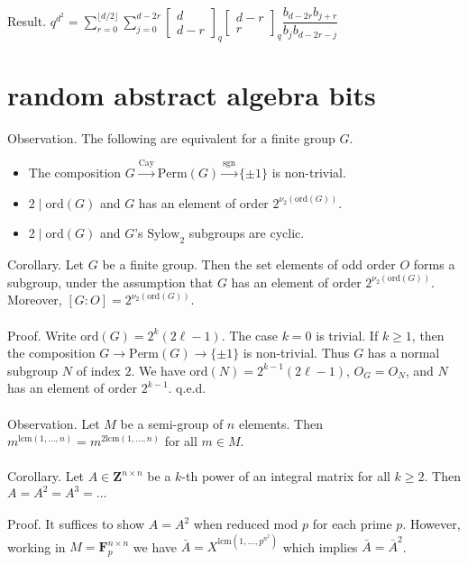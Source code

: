 \documentclass[english]{article}
\renewcommand\to{\longrightarrow}
\def\Z{\mathbf{Z}}
\def\F{\mathbf{F}}
\def\disp{\displaystyle}
\newcommand\floor[1]{\lfloor{#1}\rfloor}
\newcommand\syl[1]{$\text{Sylow}_{#1}$}
\def\ord{\text{ord}}
\def\lcm{\text{lcm}}
\def\perm{\text{Perm}}
\def\cay{\text{Cay}}
\def\sgn{\text{sgn}}
\newcommand\set[1]{\{#1\}}
\begin{document}
Result. $q^{d^2}=\disp \sum_{r=0}^{\floor{d/2}}\sum_{j=0}^{d-2r}\left[\begin{array}{c}
d\\
d-r
\end{array}\right]_{q}\left[\begin{array}{c}
d-r\\
r
\end{array}\right]_{q}\dfrac{b_{d-2r}b_{j+r}}{b_{j}b_{d-2r-j}}$


\section*{random abstract algebra bits}


Observation. The following are equivalent for a finite group $G$.
\begin{itemize}
\item The composition $G\xrightarrow{\cay}\perm(G)\xrightarrow{\sgn}\{\pm1\}$ is non-trivial.
\item $2\mid \ord(G)$ and $G$ has an element of order $2^{\nu_2(\ord(G))}$.
\item $2\mid \ord(G)$ and $G$'s \syl{2} subgroups are cyclic.
\\
\end{itemize} 
Corollary. Let $G$ be a finite group. Then the set elements of odd order $O$ forms a subgroup, under the assumption that $G$ has an element of order $2^{\nu_2(\ord(G))}$. Moreover, $[G:O]=2^{\nu_2(\ord(G))}$.
\\\\
Proof. Write $\ord(G)=2^k(2\ell-1)$. The case $k=0$ is trivial. If $k\ge1$, then the composition $G\to\perm(G)\to\set{\pm1}$ is non-trivial. Thus $G$ has a normal subgroup $N$ of index $2$. We have $\ord(N)=2^{k-1}(2\ell-1)$, $O_G=O_N$, and $N$ has an element of order $2^{k-1}$. q.e.d.
\\\\
Observation. Let $M$ be a semi-group of $n$ elements. Then $m^{\lcm(1,\dots,n)}=m^{2\lcm(1,\dots,n)}$ for all $m\in M$.
\\\\
Corollary. Let $A\in\Z^{n\times n}$ be a $k$-th power of an integral matrix for all $k\ge 2$. Then $A=A^2=A^3=\dots$
\\\\
Proof. It suffices to show $A=A^2$ when reduced mod $p$ for each prime $p$. However, working in $M=\F_p^{n\times n}$ we have $\bar{A}={X}^{\lcm(1,\dots,p^{n^2})}$ which implies $\bar{A}=\bar{A}^2$.
\\\\
\end{document}
